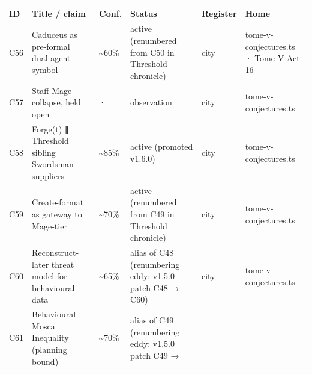 \documentclass[
]{article}
\newcounter{none} %
\begin{document}
{\def\LTcaptype{none} %
\begin{longtable}[]{@{}
  >{\raggedright\arraybackslash}p{}
  >{\raggedright\arraybackslash}p{}
  >{\raggedright\arraybackslash}p{}
  >{\raggedright\arraybackslash}p{}
  >{\raggedright\arraybackslash}p{}
  >{\raggedright\arraybackslash}p{}@{}}
\toprule\noalign{}
\begin{minipage}[b]{\linewidth}\raggedright
ID
\end{minipage} & \begin{minipage}[b]{\linewidth}\raggedright
Title / claim
\end{minipage} & \begin{minipage}[b]{\linewidth}\raggedright
Conf.
\end{minipage} & \begin{minipage}[b]{\linewidth}\raggedright
Status
\end{minipage} & \begin{minipage}[b]{\linewidth}\raggedright
Register
\end{minipage} & \begin{minipage}[b]{\linewidth}\raggedright
Home
\end{minipage} \\
\midrule\noalign{}
\endhead
\bottomrule\noalign{}
\endlastfoot
C56 & Caduceus as pre-formal dual-agent symbol & \textasciitilde60\% &
active (renumbered from C50 in Threshold chronicle) & city &
tome-v-conjectures.ts · Tome V Act 16 \\
C57 & Staff-Mage collapse, held open & · & observation & city &
tome-v-conjectures.ts \\
C58 & Forge(t) ∥ Threshold sibling Swordsman-suppliers &
\textasciitilde85\% & active (promoted v1.6.0) & city &
tome-v-conjectures.ts \\
C59 & Create-format as gateway to Mage-tier & \textasciitilde70\% &
active (renumbered from C49 in Threshold chronicle) & city &
tome-v-conjectures.ts \\
C60 & Reconstruct-later threat model for behavioural data &
\textasciitilde65\% & alias of C48 (renumbering eddy: v1.5.0 patch C48 →
C60) & city & tome-v-conjectures.ts \\
C61 & Behavioural Mosca Inequality (planning bound) &
\textasciitilde70\% & alias of C49 (renumbering eddy: v1.5.0 patch C49 →

\end{longtable}}
\end{document}
